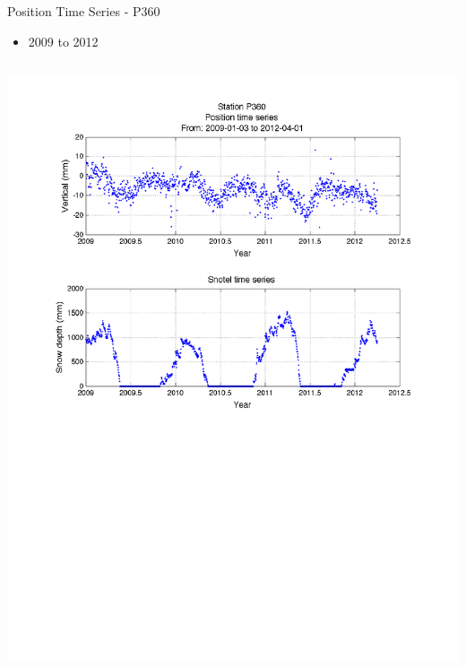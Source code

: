 \documentclass{beamer}
\begin{document}
\section[Position]{}
\begin{frame}{Position Time Series - P360}
  \begin{itemize}
  \item 2009 to 2012\\
  \end{itemize}

  \begin{columns}
    \includegraphics[width=1\linewidth,trim=70 300 70 50, clip=true]{logan/p360_pos.pdf}


\end{columns}
\end{frame}
\end{document}
